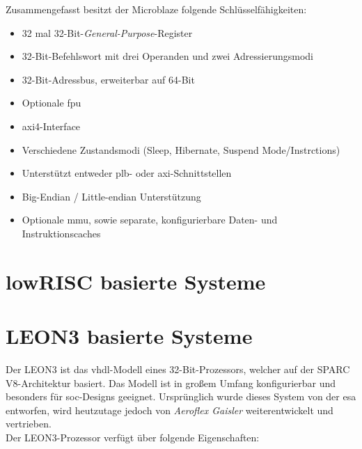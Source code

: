 Zusammengefasst besitzt der Microblaze folgende Schlüsselfähigkeiten:
\begin{itemize}
  \item 32 mal 32-Bit-\emph{General-Purpose}-Register
  \item 32-Bit-Befehlswort mit drei Operanden und zwei Adressierungsmodi
  \item 32-Bit-Adressbus, erweiterbar auf 64-Bit
  \item Optionale \ac{fpu}
  \item \ac{axi}4-Interface
  \item Verschiedene Zustandsmodi (Sleep, Hibernate, Suspend Mode/Instrctions)
  \item Unterstützt entweder \ac{plb}- oder \ac{axi}-Schnittstellen
  \item Big-Endian / Little-endian Unterstützung
  \item Optionale \ac{mmu}, sowie separate, konfigurierbare Daten- und Instruktionscaches
\end{itemize}


\newpage
\section{lowRISC basierte Systeme}\label{kap:lowrisc}


\section{LEON3 basierte Systeme}\label{kap:leon3}

Der LEON3 ist das \ac{vhdl}-Modell eines 32-Bit-Prozessors, welcher auf der SPARC V8-Architektur basiert. Das Modell ist in großem Umfang konfigurierbar und besonders für \ac{soc}-Designs geeignet.
Ursprünglich wurde dieses System von der \ac{esa} entworfen, wird heutzutage jedoch von \emph{Aeroflex Gaisler} weiterentwickelt und vertrieben.\\
Der LEON3-Prozessor verfügt über folgende Eigenschaften:\cite{leon}\\

